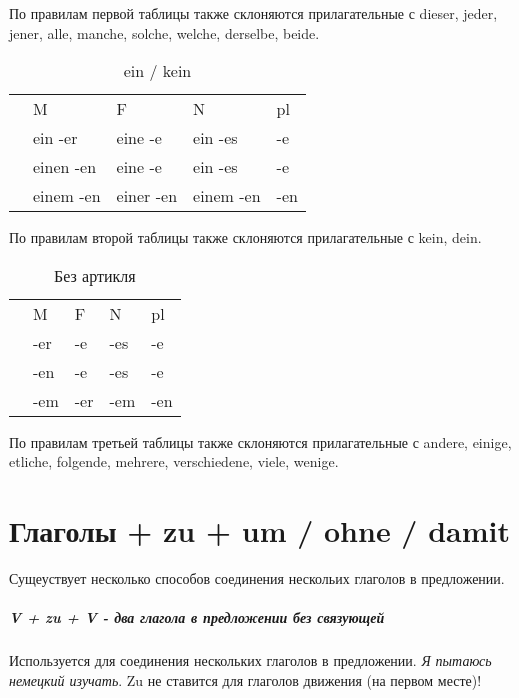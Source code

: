 \documentclass[12pt,a4paper]{report}
\newcommand{\ubersatze}[1]{\textit{#1}}
\newcommand{\nom}{ {\color{black}{\textbf{N}}} }
\newcommand{\akk}{ {\color{red}{\textbf{A}}} }
\newcommand{\dat}{ {\color{blue}{\textbf{D}}} }
\begin{document}
По правилам первой таблицы также склоняются прилагательные с dieser, jeder, jener, alle, manche, solche, welche, derselbe, beide.

\begin{longtable}{ c l l l l }
\caption{ein / kein} \label{tab:long} \\
		& M 			& F 		& N 		& pl 	\\
\nom 	& ein -er 		& eine -e	& ein -es	& -e	\\
\akk 	& einen -en 	& eine -e	& ein -es	& -e	\\
\dat 	& einem -en 	& einer -en	& einem -en	& -en	\\
\end{longtable}

По правилам второй таблицы также склоняются прилагательные с kein, dein.

\begin{longtable}{ c l l l l }
\caption{Без артикля} \label{tab:long} \\
		& M 	& F 	& N 	& pl 	\\
\nom 	& -er 	& -e	& -es	& -e	\\
\akk 	& -en 	& -e	& -es	& -e	\\
\dat 	& -em 	& -er	& -em	& -en	\\
\end{longtable}

По правилам третьей таблицы также склоняются прилагательные с andere, einige, etliche, folgende, mehrere, verschiedene, viele, wenige.


\newpage

\newpage

\newpage

\chapter{Глаголы + zu + um / ohne / damit}

Сущеуствует несколько способов соединения нескольих глаголов в предложении.

\paragraph{V + zu + V - два глагола в предложении без связующей}

Используется для соединения нескольких глаголов в предложении. \ubersatze{Я пытаюсь немецкий изучать}. Zu не ставится для глаголов движения (на первом месте)!
\end{document}
